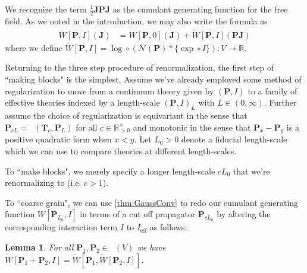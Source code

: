\documentclass[12pt]{article}
\newcounter{counter}
\theoremstyle{definition}
\theoremstyle{plain}
\newtheorem{lem}[counter]{Lemma}
\newcommand{\Symp}{\mathop{\mathrm{Sym}_2^+}}
\newcommand{\ActSym}
{\mathop{\mathrm{Act}_{\mathrm{Sym}}}}
\begin{document}
We recognize the term \(\tfrac{1}{2} \mathbf{J}\mathbf{P}\mathbf{J}\) as the cumulant generating function for the free field.
As we noted in the introduction, we may also write the formula as
\begin{align}\label{W-two-terms}
  W[\mathbf{P}, I](\mathbf{J})
  &= W[\mathbf{P}, 0](\mathbf{J}) +
  \tilde{W}[\mathbf{P}, I](\mathbf{P}\mathbf{J})
\end{align}
where we define \(\tilde{W}[\mathbf{P}, I] = \log \circ (\mathcal{N}(\mathbf{P}) * \{\exp \circ I\})\colon V \to \mathbb{R}\).

Returning to the three step procedure of renormalization, the first step of ``making blocks" is the simplest. 
Assume we've already employed some method of regularization to move from a continuum theory given by $(\mathbf{P},I)$ to a family of effective theories indexed by a length-scale $(\mathbf{P},I)_L$ with $L\in (0,\infty)$. 
Further assume the choice of regularization is equivariant in the sense that \(\mathbf{P}_{cL} = \ActSym (\mathbf{T}_c, \mathbf{P}_{L})\) for all \(c \in \mathbb{R}^{\times}_{>0}\) and monotonic in the sense that \(\mathbf{P}_{x} - \mathbf{P}_{y}\) is a positive quadratic form when $x<y$.
Let $L_0>0$ denote a fiducial length-scale which we can use to compare theories at different length-scales. 

To ``make blocks", we merely specify a longer length-scale $cL_0$ that we're renormalizing to (i.e. $c>1$).

To ``coarse grain", we can use \autoref{thm:GaussConv} to redo our cumulant generating function $W[\mathbf{P}_{L_0},I]$ in terms of a cut off propagator $\mathbf P_{cL_0}$ by altering the corresponding interaction term $I$ to $I_\text{eff}$ as follows:\\

\begin{lem}\label{eq:PIadj}
  For all \(\mathbf{P}_1, \mathbf{P}_2 \in \Symp (V)\)
   we have \( \tilde{W} [\mathbf{P}_1 + \mathbf{P}_2, I] = \tilde{W} [\mathbf{P}_1, \tilde{W} [\mathbf{P}_2, I]]\).
\end{lem}
\end{document}

